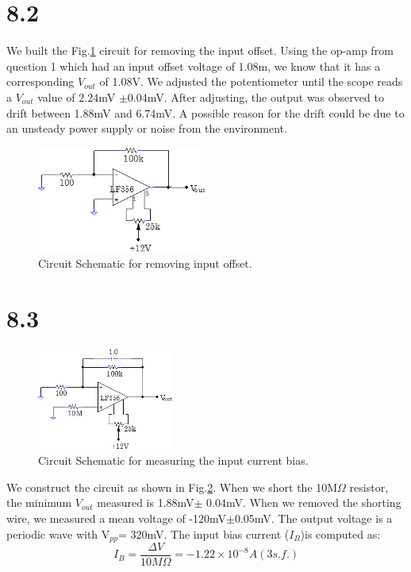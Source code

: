 \documentclass[authoryear, 12pt,5p, times]{elsarticle}
\begin{document}
 \section*{8.2}
 We built the Fig.\ref{8_2_schema} circuit for removing the input offset.  Using the op-amp from question 1 which had an input offset voltage of 1.08m, we know that it has a corresponding $V_{out}$ of 1.08V. We adjusted the potentiometer until the scope reads a $V_{out}$ value of 2.24mV $\pm$0.04mV. After adjusting, the output was observed to drift between 1.88mV and 6.74mV. A possible reason for the drift could be due to an unsteady power supply or noise from the environment. 
  \begin{figure}[h!]
 \centering
 \includegraphics[width=0.5\textwidth]{figure/8_2_schema.png}
\caption{Circuit Schematic for removing input offset.}
\label{8_2_schema}
 \end{figure}
 \section*{8.3}
   \begin{figure}[h!]
 \centering
 \includegraphics[width=0.4\textwidth]{figure/8_3_schema.png}
\caption{Circuit Schematic for measuring the input current bias.}
\label{8_3_schema}
 \end{figure}
We construct the circuit as shown in Fig.\ref{8_3_schema}.  When we short the 10M$\Omega$ resistor, the minimum $V_{out}$ measured is 1.88mV$\pm$ 0.04mV. When we removed the shorting wire, we measured a mean voltage of -120mV$\pm$0.05mV. The output voltage is a periodic wave with V$_{pp}$= 320mV. The input bias current ($I_B$)is computed as: 
 \begin{equation}
  I_B = \frac{\Delta V}{10M\Omega}=-1.22\times10^{-8} A  (3 s.f.)
\end{equation}  
\end{document}
